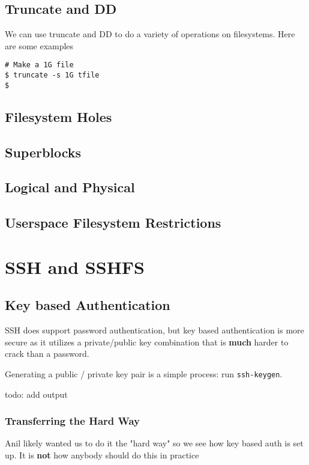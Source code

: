 \subsection{Truncate and DD}
We can use truncate and DD to do a variety of operations on filesystems. Here are some examples

\begin{verbatim}
# Make a 1G file
$ truncate -s 1G tfile 
$
\end{verbatim}


\subsection{Filesystem Holes}

\subsection{Superblocks}

\subsection{Logical and Physical}

\subsection{Userspace Filesystem Restrictions}

	 
\section {SSH and SSHFS}
\subsection{Key based Authentication}
SSH does support password authentication, but key based authentication is more secure as it utilizes a private/public key combination that is \textbf{much} harder to crack than a password.

Generating a public / private key pair is a simple process: run \texttt{ssh-keygen}.

todo: add output 

\subsubsection{Transferring the Hard Way}
Anil likely wanted us to do it the "hard way" so we see how key based auth is set up. It is \textbf{not} how anybody should do this in practice

